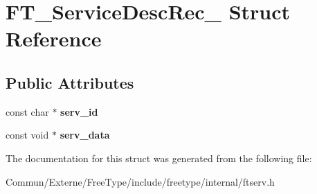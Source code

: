 \hypertarget{struct_f_t___service_desc_rec__}{}\section{F\+T\+\_\+\+Service\+Desc\+Rec\+\_\+ Struct Reference}
\label{struct_f_t___service_desc_rec__}
\subsection*{Public Attributes}
\begin{DoxyCompactItemize}
\item 
const char $\ast$ {\bfseries serv\+\_\+id}\hypertarget{struct_f_t___service_desc_rec___ab706270db01e1398233571f10bd249d4}{}\label{struct_f_t___service_desc_rec___ab706270db01e1398233571f10bd249d4}

\item 
const void $\ast$ {\bfseries serv\+\_\+data}\hypertarget{struct_f_t___service_desc_rec___aa597a33a2b0d099ec32882dc6aa38d59}{}\label{struct_f_t___service_desc_rec___aa597a33a2b0d099ec32882dc6aa38d59}

\end{DoxyCompactItemize}


The documentation for this struct was generated from the following file\+:\begin{DoxyCompactItemize}
\item 
Commun/\+Externe/\+Free\+Type/include/freetype/internal/ftserv.\+h\end{DoxyCompactItemize}
